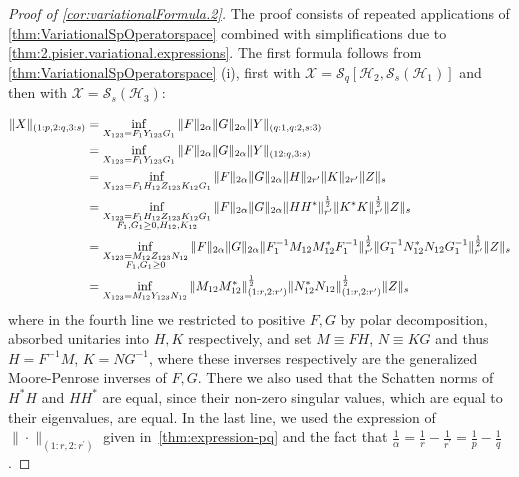 \documentclass[11pt]{article}
\newcommand{\1}{\ensuremath{\mathbbm{1}}}
\theoremstyle{newdefinition}
\theoremstyle{newplain}
\theoremstyle{myplain}
\begin{document}
\begin{proof}[Proof of \cref{cor:variationalFormula.2}]
The proof consists of repeated applications of \cref{thm:VariationalSpOperatorspace} combined with simplifications due to \cref{thm:2.pisier.variational.expressions}. The first formula follows from \cref{thm:VariationalSpOperatorspace} (i), first with $\mathcal{X} = \mathcal{S}_q[\mathcal{H}_2,\mathcal{S}_s(\mathcal{H}_1)]$ and then with $\mathcal{X} = \mathcal{S}_s(\mathcal{H}_3)$:


\begin{align}
\notag \|X\|_{(1:p,2:q,3:s)} &= \inf_{X_{123} =F_1Y_{123}G_1} \|F\|_{2\alpha}\|G\|_{2\alpha}\|Y\|_{(q:1,q:2,s:3)} \\
&= \inf_{X_{123} =F_1Y_{123}G_1} \|F\|_{2\alpha}\|G\|_{2\alpha}\|Y\|_{(12:q,3:s)} 
\\ &= \inf_{ X_{123}=F_1 H_{12} Z_{123} K_{12} G_1} \|F\|_{2\alpha} \|G\|_{2\alpha} \|H\|_{2r^\prime} \|K\|_{2r^\prime} \|Z\|_s 
\\&= \inf_{\substack{X_{123}=F_1H_{12}Z_{123}K_{12}G_1\\F_1, G_1\geq 0,H_{12},K_{12} }} \|F\|_{2\alpha} \|G\|_{2\alpha} \|HH^*\|^{\frac{1}{2}}_{r^\prime} \|K^*K\|^{\frac{1}{2}}_{r^\prime} \|Z\|_s 
\\ &= \inf_{\substack{X_{123}=M_{12} Z_{123} N_{12}\\F_1,G_1\geq 0 }} \|F\|_{2\alpha} \|G\|_{2\alpha} \|F_1^{-1}M_{12}M_{12}^*F_1^{-1}\|^{\frac{1}{2}}_{r^\prime} \|G_1^{-1}N_{12}^*N_{12}G_1^{-1}\|^{\frac{1}{2}}_{r^\prime} \|Z\|_s
\\ &= \inf_{ X_{123}=M_{12}Y_{123}N_{12}}\|M_{12}M_{12}^*\|^{\frac{1}{2}}_{(1:r,2:r^\prime)}\|N_{12}^*N_{12}\|^{\frac{1}{2}}_{(1:r,2:r^\prime)}\|Z\|_s
    \end{align}
    where in the fourth line we restricted to positive $F,G$ by polar decomposition, absorbed unitaries into $H,K$ respectively, and set $M\equiv FH$, $N\equiv KG$ and thus $H=F^{-1}M$, $K=NG^{-1}$, where these inverses respectively are the generalized Moore-Penrose inverses of $F,G$. There we also used that the Schatten norms of $H^*H$ and $HH^*$ are equal, since their non-zero singular values, which are equal to their eigenvalues, are equal. 
    In the last line, we used the expression of $\|\cdot\|_{(1:r,2:r^\prime)}$ given in~\cref{thm:expression-pq} and the fact that $\frac{1}{\alpha}=\frac{1}{r}-\frac{1}{r^\prime}=\frac{1}{p}-\frac{1}{q}$.


\end{proof}
\end{document}
